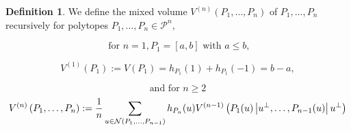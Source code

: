 \documentclass[oneside]{book}
\theoremstyle{definition}
\newtheorem{mydef}{Definition}[chapter]
\begin{document}
\begin{mydef}


We define the mixed volume $V^{(n)}\left(P_{1}, \ldots, P_{n}\right)$ of $P_{1}, \ldots, P_{n}$ recursively for polytopes $P_{1}, \ldots, P_{n} \in \mathcal{P}^{n},$ 

 
$$ \text{ for } n = 1, P_{1}=[a, b] \text { with } a \leq b,$$ 
    
  \begin{equation}
  \label{eq49}
      V^{(1)}\left(P_{1}\right):=V\left(P_{1}\right)=h_{P_{1}}(1)+h_{P_{1}}(-1) = b - a,  
  \end{equation} 

$$\text{and} \text { for } n \geq 2 $$ 
\begin{equation} \label{eq50}
\\
V^{(n)}\left(P_{1}, \ldots, P_{n}\right):=\frac{1}{n} \sum_{u \in \mathcal{N}\left(P_{1}, \ldots, P_{n-1}\right)} h_{P_{n}}(u) V^{(n-1)}\left(P_{1}(u)\left|u^{\perp}, \ldots, P_{n-1}(u)\right| u^{\perp}\right)
\end{equation}
  \end{mydef}     
\end{document}
